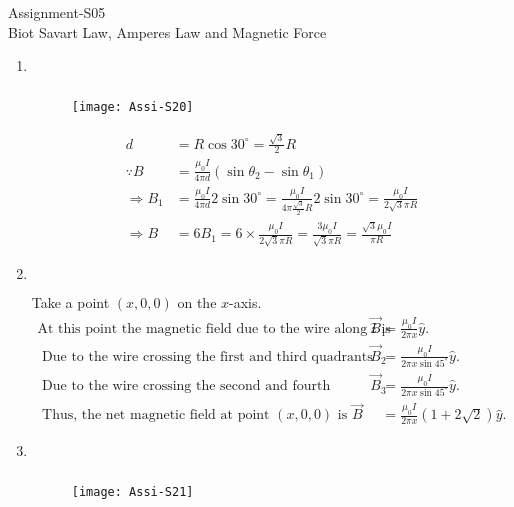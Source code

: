 \begin{abox}
	Assignment-S05\\
	\vspace{0.5cm}
	Biot Savart Law, Amperes Law and Magnetic Force
	\end{abox}
\begin{enumerate}
	\item $\left. \right. $
	\begin{answer}$\left. \right. $
		\begin{figure}[H]
			\centering
			\texttt{[image: Assi-S20]}
		\end{figure}
		\begin{align*}
		d&=R \cos 30^{\circ}=\frac{\sqrt{3}}{2} R\\
		\because B&=\frac{\mu_{0} I}{4 \pi d}\left(\sin \theta_{2}-\sin \theta_{1}\right) \\
		\Rightarrow B_{1}&=\frac{\mu_{0} I}{4 \pi d} 2 \sin 30^{\circ}=\frac{\mu_{0} I}{4 \pi \frac{\sqrt{3}}{2} R} 2 \sin 30^{\circ}=\frac{\mu_{0} I}{2 \sqrt{3} \pi R} \\
		\Rightarrow B&=6 B_{1}=6 \times \frac{\mu_{0} I}{2 \sqrt{3} \pi R}=\frac{3 \mu_{0} I}{\sqrt{3} \pi R}=\frac{\sqrt{3} \mu_{0} I}{\pi R}
		\end{align*}
	\end{answer}
	\item $\left. \right. $
	\begin{answer}
		 Take a point $(x, 0,0)$ on the $x$-axis.
		\begin{align*}
		\text{At this point the magnetic field due to the wire along $\hat{z}$ is} \vec{B}_{1}&=\frac{\mu_{0} I}{2 \pi x} \hat{y}.\\
	\text{	Due to the wire crossing the first and third quadrants is} \vec{B}_{2}&=\frac{\mu_{0} I}{2 \pi x \sin 45^{\circ}} \hat{y}.\\
	\text{	Due to the wire crossing the second and fourth quadrants is} \vec{B}_{3}&=\frac{\mu_{0} I}{2 \pi x \sin 45^{\circ}} \hat{y}.\\
	\text{	Thus, the net magnetic field at point $(x, 0,0)$ is }\vec{B}&=\frac{\mu_{0} I}{2 \pi x}(1+2 \sqrt{2}) \hat{y}.
		\end{align*}
	\end{answer}
	\item $\left. \right. $
	\begin{answer}
		$\left. \right. $
		\begin{figure}[H]
			\centering
			\texttt{[image: Assi-S21]}

\end{figure}
\end{answer}
\end{enumerate}
